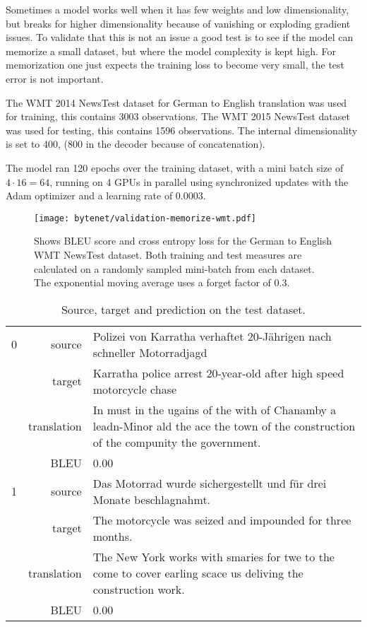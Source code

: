 Sometimes a model works well when it has few weights and low dimensionality, but breaks for higher dimensionality because of vanishing or exploding gradient issues. To validate that this is not an issue a good test is to see if the model can memorize a small dataset, but where the model complexity is kept high. For memorization one just expects the training loss to become very small, the test error is not important.

The WMT 2014 NewsTest dataset for German to English translation was used for training, this contains 3003 observations. The WMT 2015 NewsTest dataset was used for testing, this contains 1596 observations. The internal dimensionality is set to 400, (800 in the decoder because of concatenation).

The model ran 120 epochs over the training dataset, with a mini batch size of ${4 \cdot 16 = 64}$, running on 4 GPUs in parallel using synchronized updates with the Adam optimizer and a learning rate of 0.0003.

\begin{figure}[h]
    \centering
    \texttt{[image: bytenet/validation-memorize-wmt.pdf]}
    \caption{Shows BLEU score and cross entropy loss for the German to English WMT NewsTest dataset. Both training and test measures are calculated on a randomly sampled mini-batch from each dataset. The exponential moving average uses a forget factor of $0.3$.}
    \label{fig:result:bytenet:wmt}
\end{figure}

\begin{table}[h]
\centering
\begin{tabular}{l|r|p{10cm}}
  0 & source & Polizei von Karratha verhaftet 20-Jährigen nach schneller Motorradjagd \\[0.1cm]
    & target & Karratha police arrest 20-year-old after high speed motorcycle chase \\[0.1cm]
    & translation & In must in the ugains of the with of Chanamby a leadn-Minor ald the ace the town of the construction of the compunity the government. \\[0.1cm]
    & BLEU & 0.00 \\[0.1cm] \hline
  1 & source & Das Motorrad wurde sichergestellt und für drei Monate beschlagnahmt. \\[0.1cm]
    & target & The motorcycle was seized and impounded for three months. \\[0.1cm]
    & translation & The New York works with smaries for twe to the come to cover earling scace us deliving the construction work. \\[0.1cm]
    & BLEU & 0.00
\end{tabular}
\caption{Source, target and prediction on the test dataset.}
\label{table:result:bytenet:wmt-test}
\end{table}

